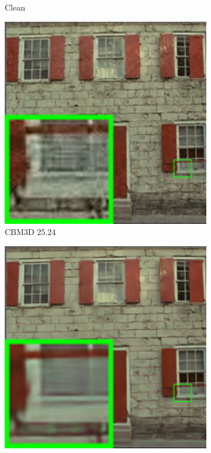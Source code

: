 \begin{figure}
\begin{subfigure}[t]{0.19\textwidth}
		\caption{Clean}
    \end{subfigure}
    \hfill
    \begin{subfigure}[t]{0.19\textwidth}
        \centering
        \includegraphics[width=1\textwidth]{images/mcwnnm/24images/resize_br_CBM3D_nSig402030_kodim01.png}
		\caption{CBM3D 25.24}
    \end{subfigure}
    \hfill
    \begin{subfigure}[t]{0.19\textwidth}
        \centering
        \includegraphics[width=1\textwidth]{images/mcwnnm/24images/resize_br_MLP_nSig402030_kodim01.png}

\end{subfigure}
\end{figure}
